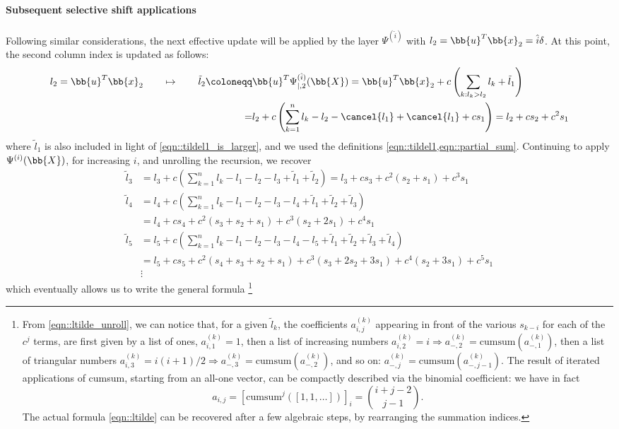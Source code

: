 \paragraph{Subsequent selective shift applications}
Following similar considerations, the next effective update will be applied by the layer $\Psi^{(\hat{i})}$ with $l_2=\bb{u}^T\bb{x}_2=\hat{i}\delta$. At this point, the second column index is updated as follows:
\begin{equation}
\begin{split}
    l_2=\bb{u}^T\bb{x}_2\qquad\mapsto\qquad\tilde{l}_2\coloneqq&\bb{u}^T\Psi^{(\hat{i})}_{|,2}(\bb{X})
    =\bb{u}^T\bb{x}_2+ c\left(\sum_{k:l_k>l_2}l_k + \tilde{l}_1\right) \\
    =& l_2 + c \left(\sum_{k=1}^{n}l_k - l_2 - \cancel{l_1} + \cancel{l_1} + cs_1\right) = l_2 + c s_2 + c^2 s_1
\end{split}
\end{equation}
where $\tilde{l}_1$ is also included in light of \cref{eqn::tildel1_is_larger}, and we used the definitions \cref{eqn::tildel1,eqn::partial_sum}. Continuing to apply $\Psi^{(i)}(\bb{X})$, for increasing $i$, and unrolling the recursion, we recover
\begin{equation}
\begin{split}
    \tilde{l}_3 &= l_3 + c\left(\sum_{k=1}^{n}l_k - l_1 - l_2 -l_3 + \tilde{l}_1 + \tilde{l}_2\right)
        = l_3 + cs_3 + c^{2}(s_2+s_1) + c^{3}s_1\\
    \tilde{l}_4 &= l_4 + c\left(\sum_{k=1}^{n}l_k - l_1 - l_2 - l_3 - l_4 + \tilde{l}_1 + \tilde{l}_2 + \tilde{l}_3\right)\\
        &= l_4 + cs_4 + c^{2}(s_3+s_2+s_1) + c^{3}(s_2+2s_1) + c^{4}s_1\\
    \tilde{l}_5 &= l_5 + c\left(\sum_{k=1}^{n}l_k - l_1 - l_2 - l_3 - l_4 - l_5 + \tilde{l}_1 + \tilde{l}_2 + \tilde{l}_3 + \tilde{l}_4\right)\\
        &= l_5 + cs_5 + c^{2}(s_4+s_3+s_2+s_1) + c^{3}(s_3+2s_2+3s_1) + c^{4}(s_2+3s_1) + c^{5}s_1\\
        &\vdots
\end{split}
\label{eqn::ltilde_unroll}
\end{equation}
which eventually allows us to write the general formula
\footnote{From \cref{eqn::ltilde_unroll}, we can notice that, for a given $\tilde{l}_k$, the coefficients $a_{i,j}^{(k)}$ appearing in front of the various $s_{k-i}$ for each of the $c^{j}$ terms, are first given by a list of ones, $a_{i,1}^{(k)} = 1$, then a list of increasing numbers $a_{i,2}^{(k)}=i \Longrightarrow a_{-,2}^{(k)} = \text{cumsum}(a_{-,1}^{(k)})$, then a list of triangular numbers $a_{i,3}^{(k)}=i(i+1)/2\Longrightarrow a_{-,3}^{(k)} = \text{cumsum}(a_{-,2}^{(k)})$, and so on: $a_{-,j}^{(k)}= \text{cumsum}(a_{-,j-1}^{(k)})$. The result of iterated applications of cumsum, starting from an all-one vector, can be compactly described via the binomial coefficient: we have in fact
$$a_{i,j} = [\text{cumsum}^j([1,1,\dots])]_i=\binom{i+j-2}{j-1}.$$ The actual formula \cref{eqn::ltilde} can be recovered after a few algebraic steps, by rearranging the summation indices.}
